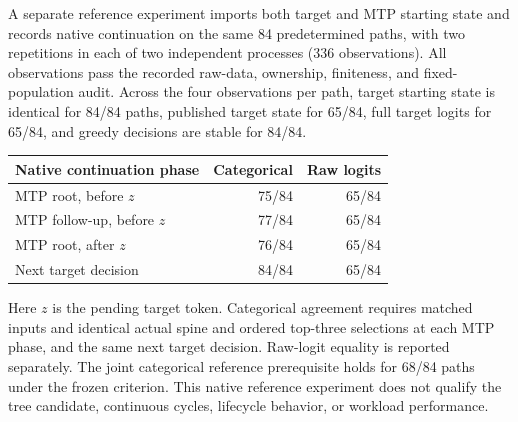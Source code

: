 A separate reference experiment imports both target and MTP starting state and
records native continuation on the same 84 predetermined paths, with two repetitions
in each of two independent processes (336 observations). All observations pass
the recorded raw-data, ownership, finiteness, and fixed-population audit.
Across the four observations per path, target starting state is identical for
84/84 paths, published target state for 65/84,
full target logits for 65/84, and greedy decisions are
stable for 84/84.

\begin{center}
\begin{tabular}{lrr}
\toprule
Native continuation phase & Categorical & Raw logits \\
\midrule
MTP root, before $z$ & 75/84 & 65/84 \\
MTP follow-up, before $z$ & 77/84 & 65/84 \\
MTP root, after $z$ & 76/84 & 65/84 \\
Next target decision & 84/84 & 65/84 \\
\bottomrule
\end{tabular}
\end{center}
Here $z$ is the pending target token. Categorical agreement requires matched inputs and identical actual spine and
ordered top-three selections at each MTP phase, and the same next target decision.
Raw-logit equality is reported separately. The joint categorical reference
prerequisite holds for 68/84 paths under the frozen
criterion. This native reference experiment does not qualify the tree candidate,
continuous cycles, lifecycle behavior, or workload performance.
